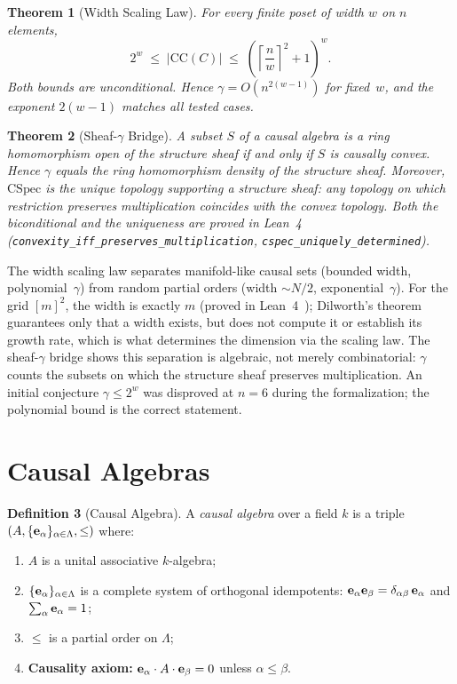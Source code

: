 \documentclass[11pt,a4paper]{article}
\theoremstyle{plain}
\newtheorem{theorem}{Theorem}[section]
\theoremstyle{definition}
\newtheorem{definition}[theorem]{Definition}
\theoremstyle{remark}
\newcommand{\CSpec}{\mathrm{CSpec}}
\newcommand{\CC}{\mathrm{CC}}
\begin{document}
\begin{theorem}[Width Scaling Law]\label{thm:G}
For every finite poset of width $w$ on $n$ elements,
\[
2^w \;\leq\; |\CC(C)| \;\leq\; \left(\left\lceil \frac{n}{w} \right\rceil^2 + 1\right)^w.
\]
Both bounds are unconditional.
Hence $\gamma = O(n^{2(w-1)})$ for fixed~$w$, and the exponent $2(w-1)$ matches all tested cases.
\end{theorem}

\begin{theorem}[Sheaf-$\gamma$ Bridge]\label{thm:H}
A subset $S$ of a causal algebra is a ring homomorphism open of the structure sheaf if and only if $S$ is causally convex.
Hence $\gamma$ equals the ring homomorphism density of the structure sheaf.
Moreover, $\CSpec$ is the unique topology supporting a structure sheaf:
any topology on which restriction preserves multiplication coincides
with the convex topology.
Both the biconditional and the uniqueness are proved in
Lean~4~\cite{leanrepo} (\texttt{convexity\_iff\_preserves\_multiplication},
\texttt{cspec\_uniquely\_determined}).
\end{theorem}

The width scaling law separates manifold-like causal sets (bounded width, polynomial~$\gamma$) from random partial orders (width $\sim N/2$, exponential~$\gamma$).
For the grid $[m]^2$, the width is exactly $m$ (proved in
Lean~4~\cite{leanrepo}); Dilworth's theorem guarantees only that
a width exists, but does not compute it or establish its growth
rate, which is what determines the dimension via the scaling law.
The sheaf-$\gamma$ bridge shows this separation is algebraic, not merely combinatorial: $\gamma$ counts the subsets on which the structure sheaf preserves multiplication.
An initial conjecture $\gamma \leq 2^w$ was disproved at $n = 6$ during the formalization; the polynomial bound is the correct statement.


\section{Causal Algebras}\label{sec:calg}

\begin{definition}[Causal Algebra]\label{def:calg}
A \emph{causal algebra} over a field $k$ is a triple $(A, \{{\bf e}_\alpha\}_{\alpha \in \Lambda}, \leq)$ where:
\begin{enumerate}[nosep]
\item $A$ is a unital associative $k$-algebra;
\item $\{{\bf e}_\alpha\}_{\alpha \in \Lambda}$ is a complete system of orthogonal idempotents: ${\bf e}_\alpha {\bf e}_\beta = \delta_{\alpha\beta}\,{\bf e}_\alpha$ and $\sum_\alpha {\bf e}_\alpha = 1$;
\item $\leq$ is a partial order on $\Lambda$;
\item \textbf{Causality axiom:} ${\bf e}_\alpha \cdot A \cdot {\bf e}_\beta = 0$ unless $\alpha \leq \beta$.
\end{enumerate}
\end{definition}
\end{document}
